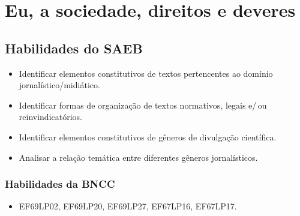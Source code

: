 \chapter{Eu, a sociedade, direitos e deveres}

\section*{Habilidades do SAEB}
\begin{itemize}
\item Identificar elementos constitutivos de textos pertencentes ao domínio jornalístico/midiático.
\item Identificar formas de organização de textos normativos, legais e/\,ou reinvindicatórios.
\item Identificar elementos constitutivos de gêneros de divulgação científica.
\item Analisar a relação temática entre diferentes gêneros jornalísticos.
\end{itemize}

\subsection*{Habilidades da BNCC} 
\begin{itemize}
\item EF69LP02, EF69LP20, EF69LP27, EF67LP16, EF67LP17.
\end{itemize}

